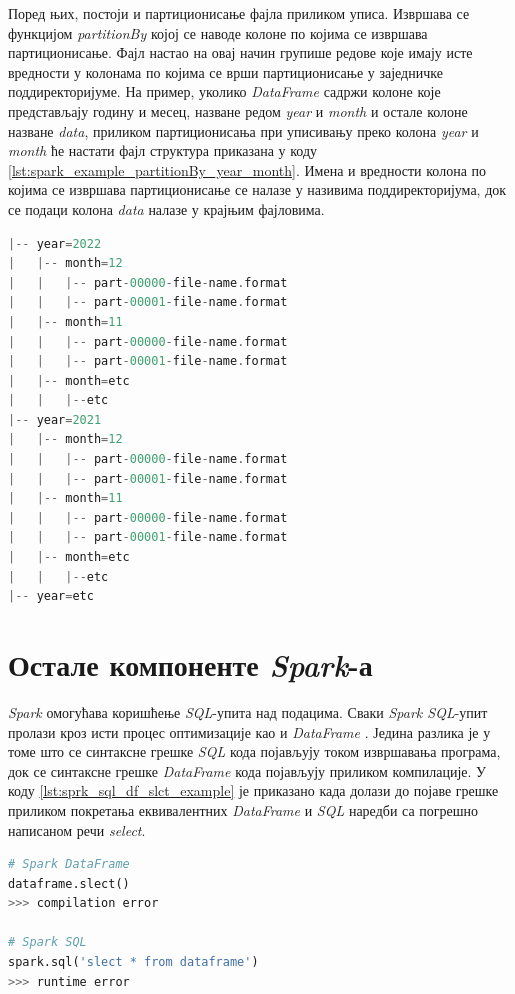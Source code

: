 \documentclass[12pt,oneside]{memoir}
\begin{document}
Поред њих, постоји и партиционисање фајла приликом уписа. Извршава се функцијом \textit{partitionBy} којој се наводе колоне по којима се извршава партиционисање. Фајл настао на овај начин групише редове које имају исте вредности у колонама по којима се врши партиционисање у заједничке поддиректоријуме. На пример, уколико \textit{DataFrame} садржи колоне које представљају годину и месец, назване редом \textit{year} и \textit{month} и остале колоне назване \textit{data}, приликом партиционисања при уписивању преко колона \textit{year} и \textit{month} ће настати фајл структура приказана у коду \ref{lst:spark_example_partitionBy_year_month}. Имена и вредности колона по којима се извршава партиционисање се налазе у називима поддиректоријума, док се подаци колона \textit{data} налазе у крајњим фајловима.

\begin{lstlisting}[caption={Пример структуре излазног директоријума који настаје партиционисањем}, language=Scala, label={lst:spark_example_partitionBy_year_month}]
|-- year=2022
|   |-- month=12
|   |   |-- part-00000-file-name.format
|   |   |-- part-00001-file-name.format
|   |-- month=11
|   |   |-- part-00000-file-name.format
|   |   |-- part-00001-file-name.format
|   |-- month=etc
|   |   |--etc
|-- year=2021
|   |-- month=12
|   |   |-- part-00000-file-name.format
|   |   |-- part-00001-file-name.format
|   |-- month=11
|   |   |-- part-00000-file-name.format
|   |   |-- part-00001-file-name.format
|   |-- month=etc
|   |   |--etc
|-- year=etc
\end{lstlisting}

\section{Остале компоненте \textit{Spark}-а}
\label{sec:spark_components}

\textit{Spark} омогућава коришћење \textit{SQL}-упита над подацима. Сваки \textit{Spark SQL}-упит пролази кроз исти процес оптимизације као и \textit{DataFrame} \cite{spark_guide}. Једина разлика је у томе што се синтаксне грешке \textit{SQL} кода појављују током извршавања програма, док се синтаксне грешке \textit{DataFrame} кода појављују приликом компилације. У коду \ref{lst:sprk_sql_df_slct_example} је приказано када долази до појаве грешке приликом покретања еквивалентних \textit{DataFrame} и \textit{SQL} наредби са погрешно написаном речи \textit{select}.  

\begin{lstlisting}[language=Python, caption={Извршавање \textit{DataFrame} и  \textit{SQL} кодова са грешком у писању}, label={lst:sprk_sql_df_slct_example}]
# Spark DataFrame
dataframe.slect()
>>> compilation error

# Spark SQL
spark.sql('slect * from dataframe')
>>> runtime error
\end{lstlisting}
\end{document}
